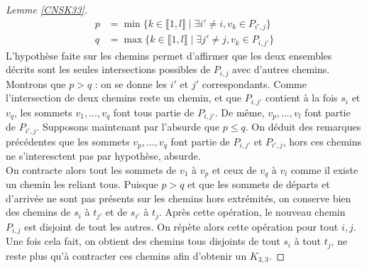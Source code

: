 \documentclass{scrartcl}
\begin{document}
\begin{flushleft}
\begin{proof}[Lemme \ref{CNSK33}]
\begin{equation*}
\begin{split}
        p &= \min \{ k \in \llbracket 1, l \rrbracket \mid \exists i' \neq i, v_k \in P_{i',j}\}\\
        q &= \max \{ k \in \llbracket 1, l \rrbracket \mid \exists j' \neq j, v_k \in P_{i, j'} \}
    \end{split}
    \end{equation*}
    L'hypothèse faite sur les chemins permet d'affirmer que les deux ensembles décrits sont les seules intersections possibles de $P_{i,j}$
    avec d'autres chemins.\\
    Montrons que $p > q$ : on se donne les $i'$ et $j'$ correspondants. Comme l'intersection de deux chemins reste un chemin, et que $P_{i,j'}$
    contient à la fois $s_i$ et $v_q$, les sommets $v_1, ..., v_q$ font tous partie de $P_{i,j'}$. De même, $v_p, ..., v_l$ font partie
    de $P_{i',j}$. Supposons maintenant par l'absurde que $p \leq q$. On déduit des remarques précédentes que les sommets $v_p, ..., v_q$
    font partie de $P_{i,j'}$ et $P_{i',j}$, hors ces chemins ne s'interesctent pas par hypothèse, absurde.\\
    On contracte alors tout les sommets de $v_1$ à $v_p$ et ceux de $v_q$ à $v_l$ comme il existe un chemin les reliant tous. Puisque
    $p > q$ et que les sommets de départs et d'arrivée ne sont pas présents sur les chemins hors extrémités,
    on conserve bien des chemins de $s_i$ à $t_{j'}$ et de $s_{i'}$ à $t_j$. Après cette opération, le nouveau chemin $P_{i,j}$ est disjoint
    de tout les autres. On répète alors cette opération pour tout $i,j$.\\
    Une fois cela fait, on obtient des chemins tous disjoints de tout $s_i$ à tout $t_j$, ne reste plus qu'à contracter ces chemins afin
    d'obtenir un $K_{3,3}$.
\end{proof}




\end{flushleft}
\end{document}
